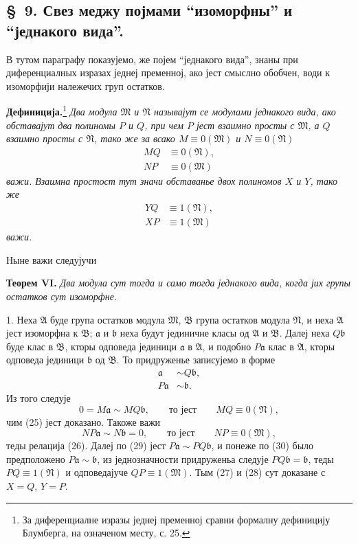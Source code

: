 ﻿\documentclass[11pt]{article}
\providecommand{\mM}{\mathfrak M}
\providecommand{\mN}{\mathfrak N}
\providecommand{\mA}{\mathfrak A}
\providecommand{\mB}{\mathfrak B}
\providecommand{\ma}{\mathfrak a}
\providecommand{\mb}{\mathfrak b}
\begin{document}

\setcounter{footnote}{16}
\subsection*{\S~9. Свез меджу појмами ``изоморфны'' и ``једнакого вида''.}

В тутом параграфу показујемо, же појем ``једнакого вида'', знаны при диференциалных изразах једнеј пременној, ако јест смыслно обобчен, води к изоморфији належечих груп остатков.

\textbf{Дефиниција.}\footnote{За диференциалне изразы једнеј пременној сравни формалну дефиницију Блумберга, на означеном месту, с. 25.} \textit{Два модула \(\mM\) и \(\mN\) называјут се модулами једнакого вида, ако обставајут два полиномы \(P\) и \(Q\), при чем \(P\) јест взаимно просты с \(\mM\), а \(Q\) взаимно просты с \(\mN\), тако же за всако \(M\equiv0(\mM)\) и \(N\equiv0(\mN)\)}
\begin{align}
 MQ&\equiv0(\mN),\tag{25}\\
 NP&\equiv0(\mM)\tag{26}
\end{align}
\textit{важи. Взаимна простост тут значи обставанье двох полиномов \(X\) и \(Y\), тако же}
\begin{align}
 YQ&\equiv1(\mN),\tag{27}\\
 XP&\equiv1(\mM)\tag{28}
\end{align}
\textit{важи.}

Ныне важи следујучи

\textbf{Теорем VI.} \textit{Два модула сут тогда и само тогда једнакого вида, когда јих групы остатков сут изоморфне.}

1. Неха \(\mA\) буде група остатков модула \(\mM\), \(\mB\) група остатков модула \(\mN\), и неха \(\mA\) јест изоморфна к \(\mB\); \(\ma\) и \(\mb\) неха будут јединичне класы од \(\mA\) и \(\mB\). Далеј неха \(Q\mb\) буде клас в \(\mB\), кторы одповеда јединици \(\ma\) в \(\mA\), и подобно \(P\ma\) клас в \(\mA\), кторы одповеда јединици \(\mb\) од \(\mB\). То придруженье записујемо в форме
\begin{align}
 \ma&\sim Q\mb,\tag{29}\\
 P\ma&\sim\mb.\tag{30}
\end{align}
Из того следује
\[
 0=M\ma\sim MQ\mb,
 \qquad\text{то јест}\qquad MQ\equiv0(\mN),
\]
чим (25) јест доказано. Такоже важи
\[
 NP\ma\sim N\mb=0,
 \qquad\text{то јест}\qquad NP\equiv0(\mM),
\]
теды релација (26). Далеј по (29) јест \(P\ma\sim PQ\mb\), и понеже по (30) было предположено \(P\ma\sim\mb\), из једнозначности придруженьа следује \(PQ\mb=\mb\), теды \(PQ\equiv1(\mN)\) и одповедајуче \(QP\equiv1(\mM)\). Тым (27) и (28) сут доказане с \(X=Q\), \(Y=P\).
\end{document}
